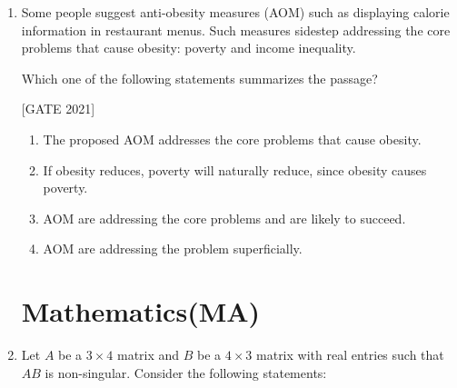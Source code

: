 \documentclass[journal,12pt,onecolumn]{IEEEtran}
\theoremstyle{remark}
\begin{document}
\begin{enumerate}
\begin{enumerate}[label={}]
    \item Statement 1: All bacteria are microorganisms.\item Statement 2: All pathogens are microorganisms.    \item Conclusion I: Some pathogens are bacteria.    \item Conclusion II: All pathogens are not bacteria.
\end{enumerate}

Based on the above statements and conclusions, which one of the following options is logically CORRECT?

\hfill{[GATE 2021]}\begin{multicols}{2}
    \begin{enumerate}
        \item Only conclusion I is correct
        \item Only conclusion II is correct
        \item Either conclusion I or II is correct
        \item Neither conclusion I nor II is correct
    \end{enumerate}
\end{multicols}

\item Some people suggest anti-obesity measures (AOM) such as displaying calorie information in restaurant menus. Such measures sidestep addressing the core problems that cause obesity: poverty and income inequality.

Which one of the following statements summarizes the passage?


\hfill{[GATE 2021]}
    \begin{enumerate}
        \item The proposed AOM addresses the core problems that cause obesity.
        \item If obesity reduces, poverty will naturally reduce, since obesity causes poverty.  \item AOM are addressing the core problems and are likely to succeed.
        \item AOM are addressing the problem superficially.
    \end{enumerate}
\section*{Mathematics(MA)}
\item  Let $ A $ be a $ 3 \times 4 $ matrix and $ B $ be a $ 4 \times 3 $ matrix with real entries such that $ AB $ is non-singular. Consider the following statements:


\end{enumerate}
\end{document}
